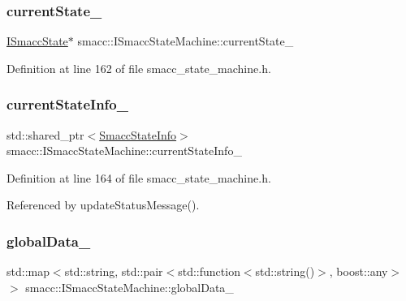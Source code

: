 \subsubsection{\texorpdfstring{current\+State\+\_\+}{currentState\_}}
{\footnotesize\ttfamily \hyperlink{classsmacc_1_1ISmaccState}{I\+Smacc\+State}$\ast$ smacc\+::\+I\+Smacc\+State\+Machine\+::current\+State\+\_\+\hspace{0.3cm}{\ttfamily [protected]}}



Definition at line 162 of file smacc\+\_\+state\+\_\+machine.\+h.

\mbox{\label{classsmacc_1_1ISmaccStateMachine_a95e42f735cecdc231ad5372bf9fe7eaf}} 
\subsubsection{\texorpdfstring{current\+State\+Info\+\_\+}{currentStateInfo\_}}
{\footnotesize\ttfamily std\+::shared\+\_\+ptr$<$\hyperlink{classsmacc_1_1introspection_1_1SmaccStateInfo}{Smacc\+State\+Info}$>$ smacc\+::\+I\+Smacc\+State\+Machine\+::current\+State\+Info\+\_\+\hspace{0.3cm}{\ttfamily [protected]}}



Definition at line 164 of file smacc\+\_\+state\+\_\+machine.\+h.



Referenced by update\+Status\+Message().

\mbox{\label{classsmacc_1_1ISmaccStateMachine_ad2f9dae184ea942db632ac4532a10a91}} 
\subsubsection{\texorpdfstring{global\+Data\+\_\+}{globalData\_}}
{\footnotesize\ttfamily std\+::map$<$std\+::string, std\+::pair$<$std\+::function$<$std\+::string()$>$, boost\+::any$>$ $>$ smacc\+::\+I\+Smacc\+State\+Machine\+::global\+Data\+\_\+\hspace{0.3cm}{\ttfamily [private]}}



